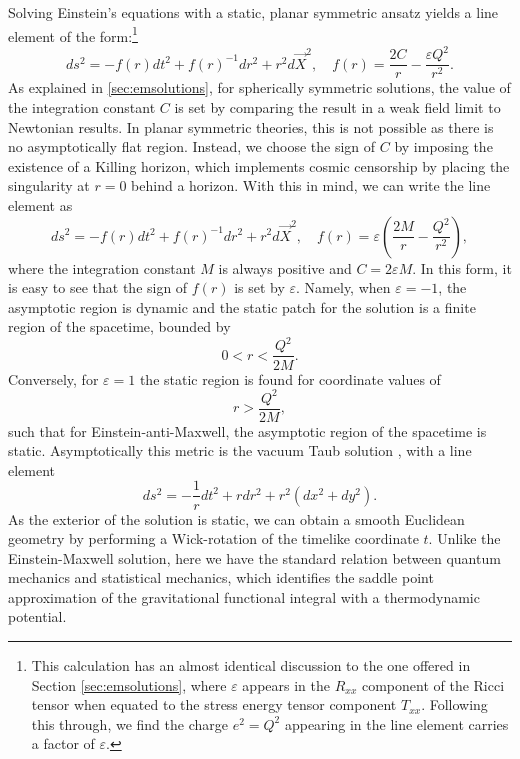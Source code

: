 Solving Einstein's equations with a static, planar symmetric ansatz yields a line element of the form:\footnote{This calculation has an almost identical discussion to the one offered in Section \ref{sec:emsolutions}, where $\varepsilon$ appears in the $R_{xx}$ component of the Ricci tensor when equated to the stress energy tensor component $T_{xx}$. Following this through, we find the charge $e^2 = Q^2$ appearing in the line element carries a factor of $\varepsilon$.}
\begin{equation}
    ds^2 = -f(r) dt^2 + f(r)^{-1} dr^2 + r^2 d\vec{X}^2,  \quad f(r) = \frac{2 C}{r} -  \frac{\varepsilon Q^2}{r^2}.
\end{equation}
As explained in \ref{sec:emsolutions}, for spherically symmetric solutions, the value of the integration constant $C$ is set by comparing the result in a weak field limit to Newtonian results. In planar symmetric theories, this is not possible as there is no asymptotically flat region. Instead, we choose the sign of $C$ by imposing the existence of a Killing horizon, which implements cosmic censorship by placing the singularity at $r=0$ behind a horizon. With this in mind, we can write the line element as
\begin{equation}
    ds^2 = -f(r) dt^2 + f(r)^{-1} dr^2 + r^2 d\vec{X}^2,  \quad f(r) = \varepsilon \left(\frac{2M}{r} -  \frac{Q^2}{r^2} \right),
\end{equation}
where the integration constant $M$ is always positive and $C = 2 \varepsilon  M$. In this form, it is easy to see that the sign of $f(r)$ is set by $\varepsilon$. Namely, when $\varepsilon = -1$, the asymptotic region is dynamic and the static patch for the solution is a finite region of the spacetime, bounded by
\begin{equation*}
0 < r < \frac{Q^2}{2 M}.
\end{equation*}
Conversely, for $\varepsilon = 1$ the static region is found for coordinate values of 
\begin{equation*}
r > \frac{Q^2}{2 M},
\end{equation*}
such that for Einstein-anti-Maxwell, the asymptotic region of the spacetime is static. Asymptotically this metric is the vacuum Taub solution \cite{Taub:1951}, with a line element
\begin{equation*}
	ds^2 = -\frac{1}{r} dt^2 + r dr^2 + r^2 (dx^2 + dy^2).
\end{equation*}
As the exterior of the solution is static, we can obtain a smooth Euclidean geometry by performing a Wick-rotation of the timelike coordinate $t$. Unlike the Einstein-Maxwell solution, here we have the standard relation between quantum mechanics and statistical mechanics, which identifies the saddle point approximation of the gravitational functional integral with a thermodynamic potential.

